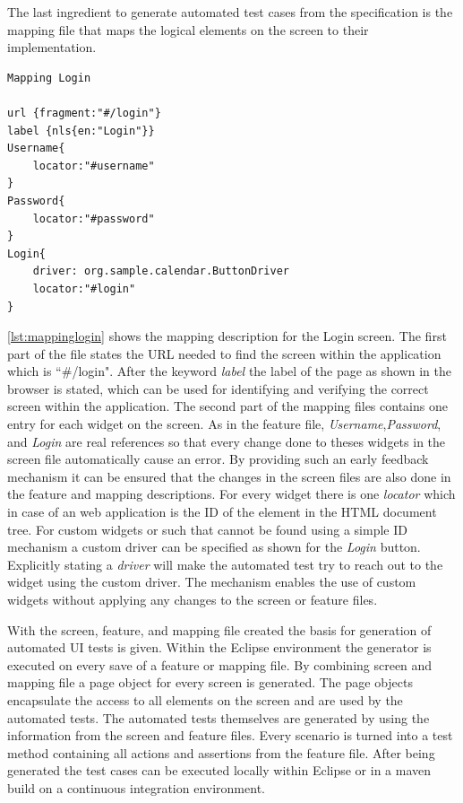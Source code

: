 \documentclass{sig-alternate-05-2015}
\begin{document}
The last ingredient to generate automated test cases from the specification is the mapping file that maps the logical elements on the screen to their implementation.
\begin{lstlisting}[captionpos=b, caption=Mapping Description: Login Screen., label={lst:mappinglogin}, language=dsl]
Mapping Login

url {fragment:"#/login"}
label {nls{en:"Login"}}
Username{
	locator:"#username"
}
Password{
	locator:"#password"
}
Login{ 
    driver: org.sample.calendar.ButtonDriver
	locator:"#login"
}
\end{lstlisting}
\cref{lst:mappinglogin} shows the mapping description for the Login screen.
The first part of the file states the URL needed to find the screen within the application which is ``\#/login". 
After the keyword \textit{label} the label of the page as shown in the browser is stated, which can be used for identifying and verifying the correct screen within the application.
The second part of the mapping files contains one entry for each widget on the screen.
As in the feature file, \textit{Username},\textit{Password}, and \textit{Login} are real references so that every change done to theses widgets in the screen file automatically cause an error.
By providing such an early feedback mechanism it can be ensured that the changes in the screen files are also done in the feature and mapping descriptions.
For every widget there is one \textit{locator} which in case of an web application is the ID of the element in the HTML document tree.
For custom widgets or such that cannot be found using a simple ID mechanism a custom driver can be specified as shown for the \textit{Login} button.
Explicitly stating a \textit{driver} will make the automated test try to reach out to the widget using the custom driver. 
The mechanism enables the use of custom widgets without applying any changes to the screen or feature files.

With the screen, feature, and mapping file created the basis for generation of automated UI tests is given.
Within the Eclipse environment the generator is executed on every save of a feature or mapping file.
By combining screen and mapping file a page object for every screen is generated.
The page objects encapsulate the access to all elements on the screen and are used by the automated tests.
The automated tests themselves are generated by using the information from the screen and feature files.
Every scenario is turned into a test method containing all actions and assertions from the feature file.
After being generated the test cases can be executed locally within Eclipse or in a maven build on a continuous integration environment.
\end{document}
